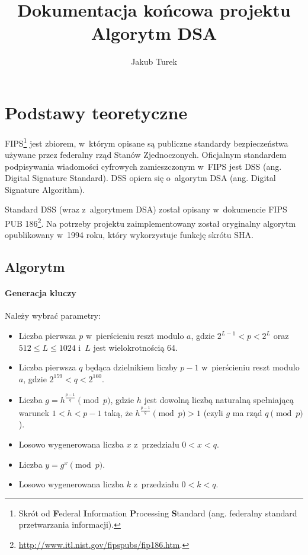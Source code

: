 \documentclass{article}
\title{Dokumentacja końcowa projektu \\ \Large{Algorytm DSA}}
\author{Jakub Turek}
\date{}
\begin{document}
    \maketitle

    \section*{Podstawy teoretyczne}
    
        FIPS\footnote{Skrót od \textbf{F}ederal \textbf{I}nformation \textbf{P}rocessing \textbf{S}tandard (ang. federalny standard przetwarzania informacji).} jest zbiorem, w~którym opisane są publiczne standardy bezpieczeństwa używane przez federalny rząd Stanów Zjednoczonych. Oficjalnym standardem podpisywania wiadomości cyfrowych zamieszczonym w~FIPS jest DSS (ang. Digital Signature Standard). DSS opiera się o~algorytm DSA (ang. Digital Signature Algorithm).
    
        Standard DSS (wraz z~algorytmem DSA) został opisany w~dokumencie FIPS PUB 186\footnote{\url{http://www.itl.nist.gov/fipspubs/fip186.htm}.}. Na potrzeby projektu zaimplementowany został oryginalny algorytm opublikowany w~1994 roku, który wykorzystuje funkcję skrótu SHA.
        
    \subsection*{Algorytm}
    
        \paragraph*{Generacja kluczy} Należy wybrać parametry:
                    
        \begin{itemize}
            \item Liczba pierwsza $p$ w~pierścieniu reszt modulo $a$, gdzie $2^{L-1} < p < 2^{L}$ oraz $512 \leq L \leq 1024$ i~$L$ jest wielokrotnością 64.
            \item Liczba pierwsza $q$ będąca dzielnikiem liczby $p - 1$ w~pierścieniu reszt modulo $a$, gdzie $2^{159} < q < 2^{160}$.
            \item Liczba $g = h^{\frac{p-1}{q}} \pmod p$, gdzie $h$ jest dowolną liczbą naturalną spełniającą warunek $1 < h < p - 1$ taką, że $h^{\frac{p-1}{q}} \pmod p > 1$ (czyli $g$ ma rząd $q \pmod p$).
            \item Losowo wygenerowana liczba $x$ z~przedziału $0 < x < q$.
            \item Liczba $y = g^{x} \pmod p$.
            \item Losowo wygenerowana liczba $k$ z~przedziału $0 < k < q$.
        \end{itemize}
            
\end{document}
